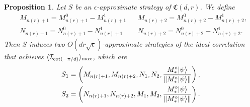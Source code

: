 \documentclass[11pt,letterpaper]{article}
\newcommand{\ket}[1]{|#1\rangle}
\DeclarePairedDelimiter{\norm}{\lVert}{\rVert}
\DeclarePairedDelimiter{\ip}{\langle}{\rangle}
\DeclareMathOperator{\spn}{span}
\DeclareMathOperator{\supp}{supp}
\newcommand{\1}{\mathbb{1}}
\newcommand{\nr}{n(r)}
\newcommand{\fC}{\mathfrak{C}}
\newcommand{\I}{\mathcal{I}}
\newcommand{\ep}{\epsilon}
\newcommand{\se}{\sqrt{\epsilon}}
\newtheorem{proposition}[theorem]{Proposition}
\theoremstyle{definition}
\begin{document}


\begin{proposition}
	\label{prop:s1s2}
	Let $S$ be an $\ep$-approximate strategy of $\fC(d,r)$. We define
	\begin{align}
		&M_{\nr+1} = M_{\nr+1}^0 - M_{\nr+1}^1  && 
		M_{\nr+2} = M_{\nr+2}^0 - M_{\nr+2}^1,\\
		&N_{\nr+1} = N_{\nr+1}^0 - N_{\nr+1}^1  && 
		N_{\nr+2} = N_{\nr+2}^0 - N_{\nr+2}^1.
	\end{align}
	Then $S$ induces two $O(d r\se)$-approximate strategies of the ideal correlation that achieves $\ip{\I_{\cot(-\pi/d)}}_{\max}$, which are
	\begin{align}
		S_1 = \left(M_{\nr+1}, M_{\nr+2}, N_1, N_2, \frac{M_\ast^\diamond\ket{\psi}}{\norm{M_\ast^\diamond\ket{\psi}}}\right),\\
		S_2 = \left(N_{\nr+1}, N_{\nr+2}, M_1, M_2, \frac{M_\ast^\diamond\ket{\psi}}{\norm{M_\ast^\diamond\ket{\psi}}}\right).
	\end{align}
\end{proposition}
\end{document}
